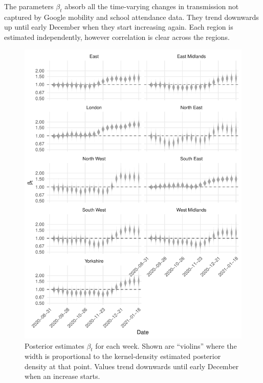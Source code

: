 \documentclass[thesis.tex]{subfiles}
\begin{document}


The parameters $\beta_t$ absorb all the time-varying changes in transmission not captured by Google mobility and school attendance data.
They trend downwards up until early December when they start increasing again.
Each region is estimated independently, however correlation is clear across the regions.

\begin{figure}
    \includegraphics{SEIR/CIS/beta_walk}
    \caption[Posterior estimates of $\beta_t$]{%
        Posterior estimates $\beta_t$ for each week.
        Shown are ``violins'' where the width is proportional to the kernel-density estimated posterior density at that point.
        Values trend downwards until early December when an increase starts.
    }
    \label{SEIR:fig:beta-walk}
\end{figure}
\end{document}
